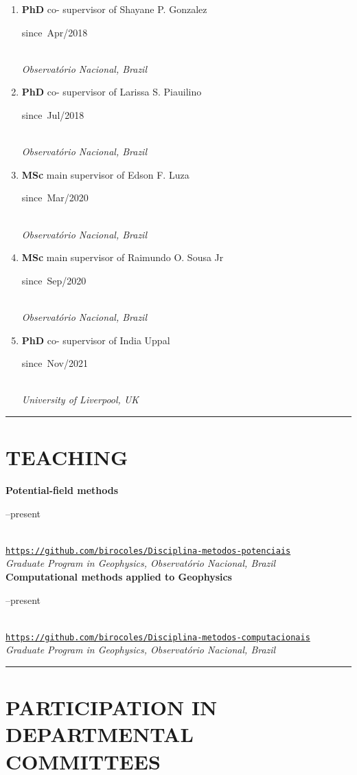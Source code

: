 \documentclass[11pt,a4paper,onecolumn]{article}
\newcommand{\Student}[5]{
	\noindent \textbf{#1} #2 supervisor of #3 \hfill 
	\parbox{0.1\textwidth}{\raggedleft since~#4} \\
	\noindent\textsl{#5}}
\begin{document}
\begin{enumerate}[leftmargin=*, label=\textbf{(\arabic*)}]
	
	\item\Student{PhD}{co-}{Shayane P. Gonzalez}{Apr/2018}{Observat{\'o}rio Nacional, Brazil}

	\item\Student{PhD}{co-}{Larissa S. Piauilino}{Jul/2018}{Observat{\'o}rio Nacional, Brazil}

	\item\Student{MSc}{main}{Edson F. Luza}{Mar/2020}{Observat{\'o}rio Nacional, Brazil}	
	
	\item\Student{MSc}{main}{Raimundo O. Sousa Jr}{Sep/2020}{Observat{\'o}rio Nacional, Brazil}
	
	\item\Student{PhD}{co-}{India Uppal}{Nov/2021}{University of Liverpool, UK}

	
\end{enumerate}

\bigskip \hrule

\section*{TEACHING}{}

\noindent \textbf{Potential-field methods} \hfill 
\parbox{0.1\textwidth}{--present} \\
\noindent\href{https://github.com/birocoles/Disciplina-metodos-computacionais}
{\texttt{https://github.com/birocoles/Disciplina-metodos-potenciais}} \\
\noindent\textsl{Graduate Program in Geophysics, Observat\'{o}rio Nacional, Brazil} \vspace{0.5\baselineskip} \\
\noindent \textbf{Computational methods applied to Geophysics} \hfill
\parbox{0.1\textwidth}{--present} \\
\noindent\href{https://github.com/birocoles/Disciplina-metodos-computacionais}
{\texttt{https://github.com/birocoles/Disciplina-metodos-computacionais}} \\
\noindent\textsl{Graduate Program in Geophysics, Observat\'{o}rio Nacional, Brazil} \\

\bigskip \hrule

\section*{PARTICIPATION IN DEPARTMENTAL COMMITTEES}{}
\end{document}
